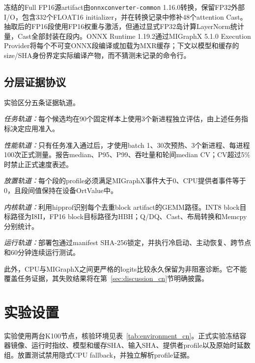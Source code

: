 \documentclass[conference]{IEEEtran}
\begin{document}
冻结的Full FP16源artifact由\texttt{onnxconverter-common} 1.16.0转换，保留FP32外部I/O，包含332个FLOAT16 initializer，并在转换记录中修补48个attention Cast。抽取后的FP16段使用FP16权重与激活，但通过显式FP32岛计算LayerNorm统计量，Cast全部封装在段内。ONNX Runtime 1.19.2通过MIGraphX 5.1.0 Execution Provider将每个不可变ONNX段编译或加载为MXR缓存；下文以模型和缓存的size/SHA身份界定实际编译产物，而不猜测未记录的命令行。

\subsection{分层证据协议}

实验区分五条证据轨道。

\textit{任务轨道：}每个候选均在90个固定样本上使用3个新进程独立评估，由上述任务指标决定应用准入。

\textit{性能轨道：}只有任务准入通过后，才使用batch 1、30次预热、3个新进程、每进程100次正式测量。报告median、P95、P99、吞吐量和轮间median CV；CV超过5\%时禁止正式速度表述。

\textit{放置轨道：}每个段的profile必须满足MIGraphX事件大于0、CPU提供者事件等于0，且段间值保持在设备OrtValue中。

\textit{内核轨道：}利用hipprof识别每个去重block artifact的GEMM路径。INT8 block目标路径为I8II，FP16 block目标路径为HBH；Q/DQ、Cast、布局转换和Memcpy分别统计。

\textit{运行轨道：}部署包通过manifest SHA-256锁定，并执行冷启动、主动恢复、跨节点和60分钟连续运行测试。

此外，CPU与MIGraphX之间更严格的logits比较永久保留为非阻塞诊断。它不能覆盖任务证据，其失败结果将在第~\ref{sec:discussion_cn}节明确披露。

\section{实验设置}
\label{sec:setup_cn}

实验使用两台K100节点，核验环境见表~\ref{tab:environment_cn}。正式实验冻结容器镜像、运行时指纹、模型和缓存SHA、输入SHA、提供者profile以及原始时延数组。放置测试禁用隐式CPU fallback，并独立解析profile证据。
\end{document}
